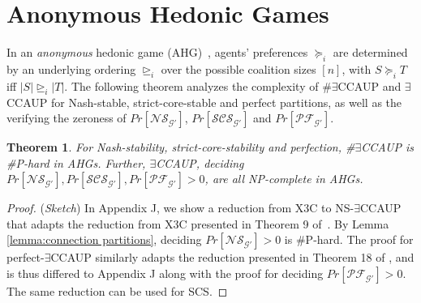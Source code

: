 \documentclass[letterpaper]{article}
\newtheorem{theorem}{Theorem}
\begin{document}
\section{Anonymous Hedonic Games}
\label{sec:Anonymous Hedonic Games}
In an \textit{anonymous} hedonic game (AHG)~\cite{ballester2004np}, agents’ preferences $\succeq_i$ are determined by an underlying ordering $\unrhd_i$ over the possible coalition sizes $[n]$, with $S \succeq_i T$ iff $|S| \unrhd_i |T|$. The following theorem analyzes the complexity of \#$\exists$CCAUP and $\exists$CCAUP for Nash-stable, strict-core-stable and perfect partitions, as well as the verifying the zeroness of $Pr[\mathcal{NS}_{\mathcal{G}'}]$, $Pr[\mathcal{SCS}_{\mathcal{G}'}]$ and $Pr[\mathcal{PF}_{\mathcal{G}'}]$.
\begin{theorem}
\label{theorem:Nash-stable-anonymous}
For Nash-stability, strict-core-stability and perfection, \#$\exists$CCAUP is \#P-hard in AHGs. Further, $\exists$CCAUP, deciding $Pr[\mathcal{NS}_{\mathcal{G}'}], Pr[\mathcal{SCS}_{\mathcal{G}'}], Pr[\mathcal{PF}_{\mathcal{G}'}] > 0$, are all NP-complete in AHGs.
\end{theorem}
\begin{proof}
(\textit{Sketch})
In Appendix J, we show a reduction from X3C to NS-$\exists$CCAUP that adapts the reduction from X3C presented in Theorem 9 of~\cite{peters2016complexity}. %
By Lemma \ref{lemma:connection partitions}, deciding $Pr[\mathcal{NS}_{\mathcal{G}'}] > 0$ is \#P-hard. The proof for perfect-$\exists$CCAUP similarly adapts the reduction presented in Theorem 18 of \cite{woeginger2013core}, and is thus differed to Appendix J along with the proof for deciding $Pr[\mathcal{PF}_{\mathcal{G}'}]>0$. The same reduction can be used for SCS.
\end{proof}
\end{document}
